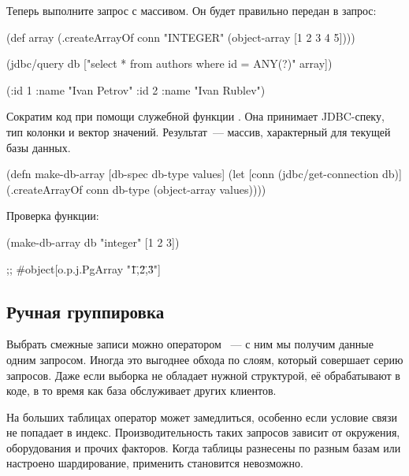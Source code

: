 Теперь выполните запрос с массивом. Он будет правильно передан в запрос:

\begin{english}
  \begin{clojure}
(def array
  (.createArrayOf conn "INTEGER"
                  (object-array [1 2 3 4 5])))

(jdbc/query db ["select * from authors
                 where id = ANY(?)" array])

({:id 1 :name "Ivan Petrov"}
 {:id 2 :name "Ivan Rublev"})
  \end{clojure}
\end{english}

Сократим код при помощи служебной функции . Она принимает JDBC-спеку, тип колонки и вектор значений. Результат~--- массив, характерный для текущей базы данных.

\begin{english}
  \begin{clojure}
(defn make-db-array [db-spec db-type values]
  (let [conn (jdbc/get-connection db)]
    (.createArrayOf conn db-type
                    (object-array values))))
  \end{clojure}
\end{english}

Проверка функции:


\begin{english}
  \begin{clojure}
(make-db-array db "integer" [1 2 3])

;; #object[o.p.j.PgArray "{\"1\",\"2\",\"3\"}"]
  \end{clojure}
\end{english}

\subsection{Ручная группировка}


Выбрать смежные записи можно оператором ~--- с ним мы получим данные одним запросом. Иногда это выгоднее обхода по слоям, который совершает серию запросов. Даже если выборка не обладает нужной структурой, её обрабатывают в коде, в то время как база обслуживает других клиентов.

На больших таблицах оператор  может замедлиться, особенно если условие связи не попадает в индекс. Производительность таких запросов зависит от окружения, оборудования и прочих факторов. Когда таблицы разнесены по разным базам или настроено шардирование, применить  становится невозможно.

